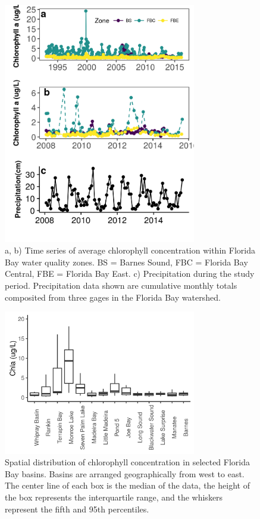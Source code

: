 \begin{figure}
  \centering
  \includegraphics[width=0.75\textwidth]{../../figures/chltimeseries.png}
  \caption{a, b) Time series of average chlorophyll concentration within Florida Bay water quality zones. BS = Barnes Sound, FBC = Florida Bay Central, FBE = Florida Bay East. c) Precipitation during the study period. Precipitation data shown are cumulative monthly totals composited from three gages in the Florida Bay watershed.}
  \label{fig:2}
\end{figure}

\newpage

\begin{figure}
  \centering
  \includegraphics[width=0.75\textwidth]{../../figures/chlboxplot.png}
  \caption{Spatial distribution of chlorophyll concentration in selected Florida Bay basins. Basins are arranged geographically from west to east. The center line of each box is the median of the data, the height of the box represents the interquartile range, and the whiskers represent the fifth and 95th percentiles. }
  \label{fig:3}
\end{figure}

